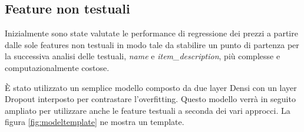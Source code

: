 



\subsection{Feature non testuali}

Inizialmente sono state valutate le performance di regressione dei prezzi a
partire dalle sole features non testuali in modo tale da stabilire un punto di
partenza per la successiva analisi delle testuali, \textit{name} e
\textit{item\_description}, più complesse e computazionalmente costose.

È stato utilizzato un semplice modello composto da due layer Densi con un layer
Dropout interposto per contrastare l'overfitting.
Questo modello verrà in seguito ampliato per utilizzare anche le feature
testuali a seconda dei vari approcci.
La figura \ref{fig:modeltemplate} ne mostra un template.

